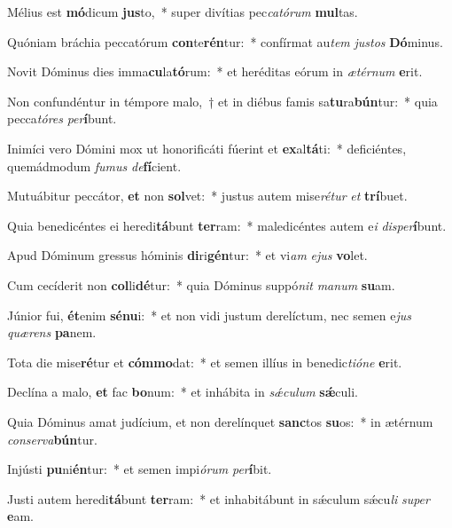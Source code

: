 \item Mélius est \textbf{mó}dicum \textbf{jus}to,~* super divítias pec\textit{ca}\textit{tó}\textit{rum} \textbf{mul}tas.
\item Quóniam bráchia peccatórum \textbf{con}te\textbf{rén}tur:~* confírmat au\textit{tem} \textit{jus}\textit{tos} \textbf{Dó}minus.
\item Novit Dóminus dies imma\textbf{cu}la\textbf{tó}rum:~* et heréditas eórum in \textit{æ}\textit{tér}\textit{num} \textbf{e}rit.
\item Non confundéntur in témpore malo,~† et in diébus famis sa\textbf{tu}ra\textbf{bún}tur:~* quia pecca\textit{tó}\textit{res} \textit{per}\textbf{í}bunt.
\item Inimíci vero Dómini mox ut honorificáti fúerint et \textbf{ex}al\textbf{tá}ti:~* deficiéntes, quemádmodum \textit{fu}\textit{mus} \textit{de}\textbf{fí}cient.
\item Mutuábitur peccátor, \textbf{et} non \textbf{sol}vet:~* justus autem mise\textit{ré}\textit{tur} \textit{et} \textbf{trí}buet.
\item Quia benedicéntes ei heredi\textbf{tá}bunt \textbf{ter}ram:~* maledicéntes autem e\textit{i} \textit{dis}\textit{per}\textbf{í}bunt.
\item Apud Dóminum gressus hóminis \textbf{di}ri\textbf{gén}tur:~* et vi\textit{am} \textit{e}\textit{jus} \textbf{vo}let.
\item Cum cecíderit non \textbf{col}li\textbf{dé}tur:~* quia Dóminus suppó\textit{nit} \textit{ma}\textit{num} \textbf{su}am.
\item Júnior fui, \textbf{ét}enim \textbf{sé}\textbf{nu}i:~* et non vidi justum derelíctum, nec semen e\textit{jus} \textit{quæ}\textit{rens} \textbf{pa}nem.
\item Tota die mise\textbf{ré}tur et \textbf{cóm}\textbf{mo}dat:~* et semen illíus in benedic\textit{ti}\textit{ó}\textit{ne} \textbf{e}rit.
\item Declína a malo, \textbf{et} fac \textbf{bo}num:~* et inhábita in \textit{sǽ}\textit{cu}\textit{lum} \textbf{sǽ}culi.
\item Quia Dóminus amat judícium, et non derelínquet \textbf{sanc}tos \textbf{su}os:~* in ætérnum \textit{con}\textit{ser}\textit{va}\textbf{bún}tur.
\item Injústi \textbf{pu}ni\textbf{én}tur:~* et semen impi\textit{ó}\textit{rum} \textit{per}\textbf{í}bit.
\item Justi autem heredi\textbf{tá}bunt \textbf{ter}ram:~* et inhabitábunt in sǽculum sǽcu\textit{li} \textit{su}\textit{per} \textbf{e}am.

